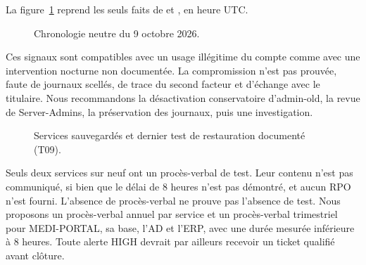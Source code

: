 La figure~\ref{fig:chrono} reprend les seuls faits de  et , en heure UTC.

\begin{figure}[H]
\centering
\resizebox{\linewidth}{!}{}
\caption{Chronologie neutre du 9 octobre 2026.}
\label{fig:chrono}
\end{figure}

Ces signaux sont compatibles avec un usage illégitime du compte comme avec une intervention nocturne non documentée. La compromission n'est pas prouvée, faute de journaux scellés, de trace du second facteur et d'échange avec le titulaire. Nous recommandons la désactivation conservatoire d'admin-old, la revue de Server-Admins, la préservation des journaux, puis une investigation.

\begin{figure}[H]
\centering
\resizebox{0.92\linewidth}{!}{}
\caption{Services sauvegardés et dernier test de restauration documenté (T09).}
\end{figure}

Seuls deux services sur neuf ont un procès-verbal de test. Leur contenu n'est pas communiqué, si bien que le délai de 8 heures n'est pas démontré, et aucun RPO n'est fourni. L'absence de procès-verbal ne prouve pas l'absence de test. Nous proposons un procès-verbal annuel par service et un procès-verbal trimestriel pour MEDI-PORTAL, sa base, l'AD et l'ERP, avec une durée mesurée inférieure à 8 heures. Toute alerte HIGH devrait par ailleurs recevoir un ticket qualifié avant clôture.
